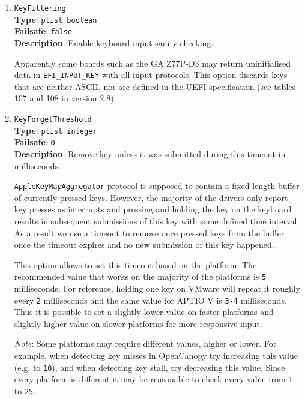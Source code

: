 \documentclass[]{article}
\begin{document}
\begin{enumerate}

\item
  \texttt{KeyFiltering}\\
  \textbf{Type}: \texttt{plist\ boolean}\\
  \textbf{Failsafe}: \texttt{false}\\
  \textbf{Description}: Enable keyboard input sanity checking.

  Apparently some boards such as the GA Z77P-D3 may return uninitialised data
  in \texttt{EFI\_INPUT\_KEY} with all input protocols.
  This option discards keys that are neither ASCII, nor are defined
  in the UEFI specification (see tables 107 and 108 in version 2.8).

\item
  \texttt{KeyForgetThreshold}\\
  \textbf{Type}: \texttt{plist\ integer}\\
  \textbf{Failsafe}: \texttt{0}\\
  \textbf{Description}: Remove key unless it was submitted during this timeout in milliseconds.

  \texttt{AppleKeyMapAggregator} protocol is supposed to contain a fixed length buffer
  of currently pressed keys. However, the majority of the drivers only report key
  presses as interrupts and pressing and holding the key on the keyboard results in
  subsequent submissions of this key with some defined time interval. As a result
  we use a timeout to remove once pressed keys from the buffer once the timeout
  expires and no new submission of this key happened.

  This option allows to set this timeout based on the platform. The recommended
  value that works on the majority of the platforms is \texttt{5} milliseconds.
  For reference, holding one key on VMware will repeat it roughly every \texttt{2}
  milliseconds and the same value for APTIO V is \texttt{3-4} milliseconds. Thus
  it is possible to set a slightly lower value on faster platforms
  and slightly higher value on slower platforms for more responsive input.

  \emph{Note}: Some platforms may require different values, higher or lower.
  For example, when detecting key misses in OpenCanopy try increasing this value
  (e.g. to \texttt{10}), and when detecting key stall, try decreasing this value.
  Since every platform is different it may be reasonable to check every value
  from \texttt{1} to \texttt{25}.


\end{enumerate}
\end{document}
